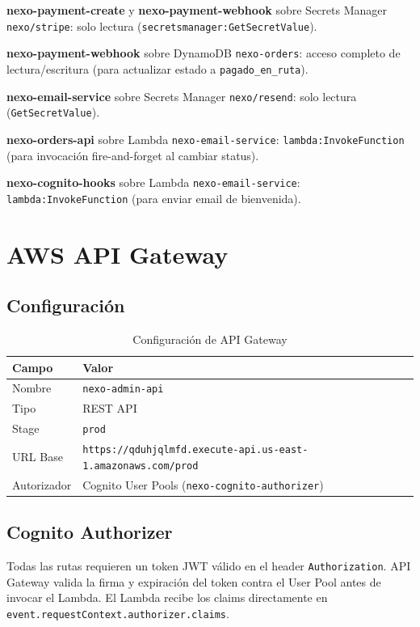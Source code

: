 \documentclass[12pt,a4paper]{article}
\begin{document}
\textbf{nexo-payment-create} y \textbf{nexo-payment-webhook} sobre Secrets Manager \texttt{nexo/stripe}: solo lectura (\texttt{secretsmanager:GetSecretValue}).

\textbf{nexo-payment-webhook} sobre DynamoDB \texttt{nexo-orders}: acceso completo de lectura/escritura (para actualizar estado a \texttt{pagado\_en\_ruta}).

\textbf{nexo-email-service} sobre Secrets Manager \texttt{nexo/resend}: solo lectura (\texttt{GetSecretValue}).

\textbf{nexo-orders-api} sobre Lambda \texttt{nexo-email-service}: \texttt{lambda:InvokeFunction} (para invocación fire-and-forget al cambiar status).

\textbf{nexo-cognito-hooks} sobre Lambda \texttt{nexo-email-service}: \texttt{lambda:InvokeFunction} (para enviar email de bienvenida).

\section{AWS API Gateway}

\subsection{Configuración}

\begin{table}[H]
\centering
\begin{tabular}{@{}ll@{}}
\toprule
\textbf{Campo} & \textbf{Valor} \\
\midrule
Nombre & \texttt{nexo-admin-api} \\
Tipo & REST API \\
Stage & \texttt{prod} \\
URL Base & \texttt{https://qduhjqlmfd.execute-api.us-east-1.amazonaws.com/prod} \\
Autorizador & Cognito User Pools (\texttt{nexo-cognito-authorizer}) \\
\bottomrule
\end{tabular}
\caption{Configuración de API Gateway}
\end{table}

\subsection{Cognito Authorizer}

Todas las rutas requieren un token JWT válido en el header \texttt{Authorization}.
API Gateway valida la firma y expiración del token contra el User Pool antes de
invocar el Lambda. El Lambda recibe los claims directamente en
\texttt{event.requestContext.authorizer.claims}.
\end{document}
